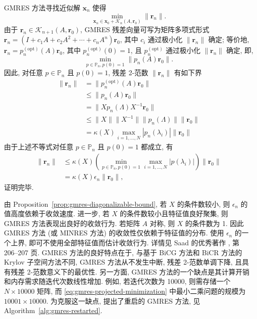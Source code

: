 \begin{Proof}
{GMRES 方法寻找近似解 $\bm x_n$ 使得}
\[\min_{\bm x_n\in\bm x_0+\mathcal K_n(A,\bm r_0)}\|\bm r_n\|.\]
{由于 $\bm r_n\in\mathcal K_{n+1}(A,\bm r_0)$, GMRES 残差向量可写为矩阵多项式形式 $\bm r_n=(I+c_1A+c_2A^2+\cdots+c_nA^n)\bm r_0$, 其中 $c_i$ 通过极小化 $\|\bm r_n\|$ 确定; 等价地, $\bm r_n=p_n^{(\mathrm{opt})}(A)\bm r_0$, 其中 $p_n^{(\mathrm{opt})}(0)=1$, 且 $p_n^{(\mathrm{opt})}$ 通过极小化 $\|\bm r_n\|$ 确定, 即,}
\[\min_{p\in\mathbb P_n,p(0)=1}\|p_n(A)\bm r_0\|.\]
{因此, 对任意 $p\in\mathbb P_n$ 且 $p(0)=1$, 残差 2-范数 $\|\bm r_n\|$ 有如下界}
\[\begin{aligned}\|\bm r_n\|&=\|p_n^{(\mathrm{opt})}(A)\bm r_0\|\\&\le\|p_n(A)\bm r_0\|\\&=\|Xp_n(\Lambda)X^{-1}\bm r_0\|\\&\le\|X\|\|X^{-1}\|\|p_n(\Lambda)\|\|\bm r_0\|\\&=\kappa(X)\max_{i=1,\ldots,N}|p_n(\lambda_i)|\|\bm r_0\|\end{aligned}\]
{由于上述不等式对任意 $p\in\mathbb P_n$ 且 $p(0)=1$ 都成立, 有}
\[\begin{aligned}\|\bm r_n\|&\le\kappa(X)\left(\min_{p\in\mathbb P_n,p(0)=1}\max_{i=1,\ldots,N}|p(\lambda_i)|\right)\|\bm r_0\|\\&=\kappa(X)\epsilon_n\|\bm r_0\|,\end{aligned}\]
{证明完毕.}
\par\nopagebreak[4]
\end{Proof}
{由 Proposition\ \ref{prop:gmres-diagonalizable-bound}, 若 $X$ 的条件数较小, 则 $\epsilon_n$ 的值高度依赖于收敛速度. 进一步, 若 $X$ 的条件数较小且特征值良好聚集, 则 GMRES 方法表现出良好的收敛行为. 若矩阵 $A$ 对称, 则 $X$ 的条件数为 1. 因此 GMRES 方法 (或 MINRES 方法) 的收敛性仅依赖于特征值的分布. 使用 $\epsilon_n$ 的一个上界, 即可不使用全部特征值而估计收敛行为. 详情见 Saad 的优秀著作 , 第 206--207 页.}
{GMRES 方法的良好特点在于, 与基于 BiCG 方法和 BiCR 方法的 Krylov 子空间方法不同, GMRES 方法从不发生中断, 残差 2-范数单调下降, 且具有残差 2-范数意义下的最优性. 另一方面, GMRES 方法的一个缺点是其计算开销和内存需求随迭代次数线性增加. 例如, 若迭代次数为 10000, 则需存储一个 $N\times10000$ 矩阵, 而 \eqref{eq:gmres-projected-minimization} 中最小二乘问题的规模为 $10001\times10000$. 为克服这一缺点, 提出了重启的 GMRES 方法, 见 Algorithm\ \ref{alg:gmres-restarted}.}
